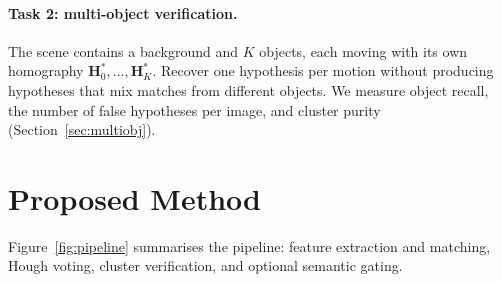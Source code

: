 \documentclass{article}
\begin{document}
\paragraph{Task 2: multi-object verification.} The scene contains a background
and $K$ objects, each moving with its own homography
$\mathbf{H}^{\ast}_0, \ldots, \mathbf{H}^{\ast}_K$. Recover one hypothesis per
motion without producing hypotheses that mix matches from different objects.
We measure object recall, the number of false hypotheses per image, and
cluster purity (Section~\ref{sec:multiobj}).

\section{Proposed Method}

Figure~\ref{fig:pipeline} summarises the pipeline: feature extraction and
matching, Hough voting, cluster verification, and optional semantic gating.
\end{document}
